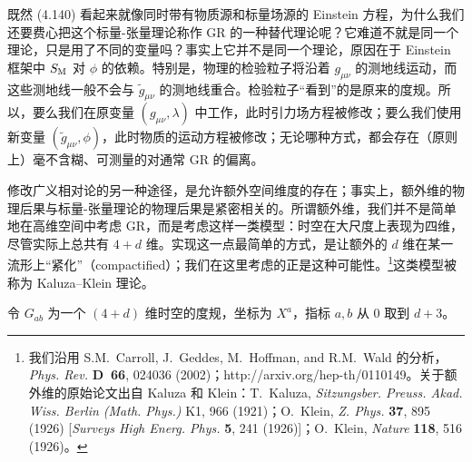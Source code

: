 既然 (4.140) 看起来就像同时带有物质源和标量场源的 Einstein 方程，为什么我们还要费心把这个标量-张量理论称作 GR 的一种替代理论呢？它难道不就是同一个理论，只是用了不同的变量吗？事实上它并不是同一个理论，原因在于 Einstein 框架中 $S_{\rm M}$ 对 $\phi$ 的依赖。特别是，物理的检验粒子将沿着 $g_{\mu\nu}$ 的测地线运动，而这些测地线一般不会与 $\widetilde{g}_{\mu\nu}$ 的测地线重合。检验粒子“看到”的是原来的度规。所以，要么我们在原变量 $(g_{\mu\nu}, \lambda)$ 中工作，此时引力场方程被修改；要么我们使用新变量 $(\widetilde{g}_{\mu\nu}, \phi)$，此时物质的运动方程被修改；无论哪种方式，都会存在（原则上）毫不含糊、可测量的对通常 GR 的偏离。

修改广义相对论的另一种途径，是允许额外空间维度的存在；事实上，额外维的物理后果与标量-张量理论的物理后果是紧密相关的。所谓额外维，我们并不是简单地在高维空间中考虑 GR，而是考虑这样一类模型：时空在大尺度上表现为四维，尽管实际上总共有 $4 + d$ 维。实现这一点最简单的方式，是让额外的 $d$ 维在某一流形上“紧化”（compactified）；我们在这里考虑的正是这种可能性。\footnote{我们沿用 S.M.~Carroll, J.~Geddes, M.~Hoffman, and R.M.~Wald 的分析，\emph{Phys. Rev.} \textbf{D~66}, 024036 (2002)；http://arxiv.org/hep-th/0110149。关于额外维的原始论文出自 Kaluza 和 Klein：T.~Kaluza, \emph{Sitzungsber. Preuss. Akad. Wiss. Berlin (Math. Phys.)} K1, 966 (1921)；O.~Klein, \emph{Z. Phys.} \textbf{37}, 895 (1926) [\emph{Surveys High Energ. Phys.} \textbf{5}, 241 (1926)]；O.~Klein, \emph{Nature} \textbf{118}, 516 (1926)。}这类模型被称为 Kaluza–Klein 理论。

令 $G_{ab}$ 为一个 $(4 + d)$ 维时空的度规，坐标为 $X^a$，指标 $a, b$ 从 0 取到 $d + 3$。
